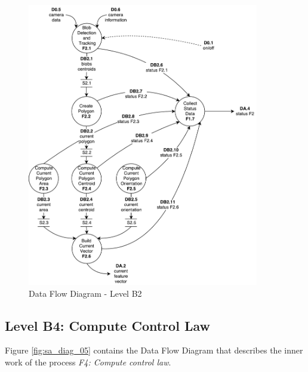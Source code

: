 \begin{figure}[!htb]
	\centering
	\includegraphics[width=0.9\textwidth]{content/chapter_03/images/sa_diagram_04.pdf}
	\caption{Data Flow Diagram - Level B2}
	\label{fig:sa_diag_04}
\end{figure}

\pagebreak

\subsection{Level B4: Compute Control Law}
\label{sec:level-B3}

Figure \ref{fig:sa_diag_05} contains the Data Flow Diagram that describes the inner work of the process \textit{F4: Compute control law}.

